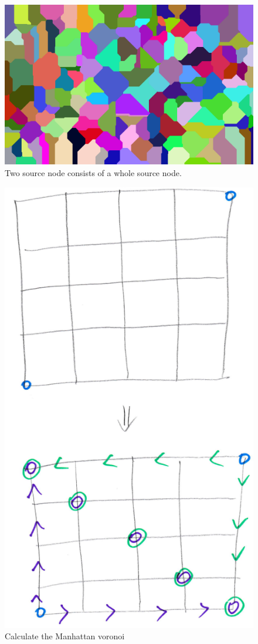 \documentclass[preprint,12pt]{elsarticle}
\begin{document}
\begin{figure}[h]
\centering\includegraphics[width=0.7\linewidth]{voronoi-manhattan}
\caption{Two source node consists of a whole source node. }
\label{voronoimanhattan}
\end{figure}


\begin{figure}[h]
\centering\includegraphics[width=0.7\linewidth]{voronoi1}
\caption{Calculate the Manhattan voronoi}
\label{voronoi1}
\end{figure}
\end{document}
